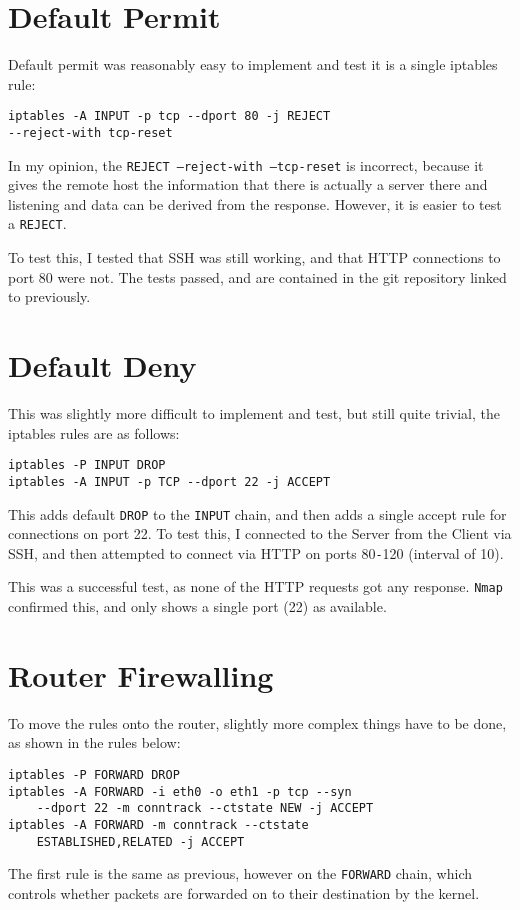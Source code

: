 \documentclass[12pt]{article}
\begin{document}
\section{Default Permit}
Default permit was reasonably easy to implement and test \- it is a single iptables rule:
\begin{verbatim}iptables -A INPUT -p tcp --dport 80 -j REJECT
--reject-with tcp-reset\end{verbatim}
In my opinion, the \texttt{REJECT --reject-with --tcp-reset} is incorrect, because it gives the remote host the information that there is actually a server there and listening and data can be derived from the response. However, it is easier to test a \texttt{REJECT}.

To test this, I tested that SSH was still working, and that HTTP connections to port 80 were not. The tests passed, and are contained in the git repository linked to previously. 
\section{Default Deny}
This was slightly more difficult to implement and test, but still quite trivial, the iptables rules are as follows:
\begin{verbatim}iptables -P INPUT DROP
iptables -A INPUT -p TCP --dport 22 -j ACCEPT\end{verbatim}
This adds default \texttt{DROP} to the \texttt{INPUT} chain, and then adds a single accept rule for connections on port 22.
To test this, I connected to the Server from the Client via SSH, and then attempted to connect via HTTP on ports 80\texttt{-}120 (interval of 10).

This was a successful test, as none of the HTTP requests got any response.
\texttt{Nmap} confirmed this, and only shows a single port (22) as available.
\newpage
\section{Router Firewalling}
To move the rules onto the router, slightly more complex things have to be done, as shown in the rules below:
\begin{verbatim}iptables -P FORWARD DROP
iptables -A FORWARD -i eth0 -o eth1 -p tcp --syn
    --dport 22 -m conntrack --ctstate NEW -j ACCEPT
iptables -A FORWARD -m conntrack --ctstate
    ESTABLISHED,RELATED -j ACCEPT\end{verbatim}

The first rule is the same as previous, however on the \texttt{FORWARD} chain, which controls whether packets are forwarded on to their destination by the kernel.
\end{document}
